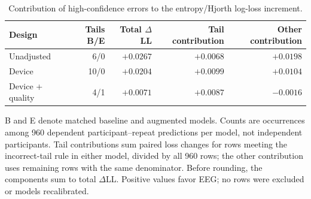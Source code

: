 \begin{table}[!htbp]
\centering\small
\caption{Contribution of high-confidence errors to the entropy/Hjorth log-loss increment.}
\label{tab:probability-tail-diagnostics}
\begin{tabular}{lrrrr}
\toprule
Design & Tails B/E & Total $\Delta$LL & Tail contribution & Other contribution\\
\midrule
Unadjusted & 6/0 & $+0.0267$ & $+0.0068$ & $+0.0198$\\
Device & 10/0 & $+0.0204$ & $+0.0099$ & $+0.0104$\\
Device + quality & 4/1 & $+0.0071$ & $+0.0087$ & $-0.0016$\\
\bottomrule
\end{tabular}
\par\smallskip\begin{minipage}{\textwidth}\footnotesize B and E denote matched baseline and augmented models. Counts are occurrences among 960 dependent participant--repeat predictions per model, not independent participants. Tail contributions sum paired loss changes for rows meeting the incorrect-tail rule in either model, divided by all 960 rows; the other contribution uses remaining rows with the same denominator. Before rounding, the components sum to total $\Delta$LL. Positive values favor EEG; no rows were excluded or models recalibrated.
\end{minipage}
\end{table}
